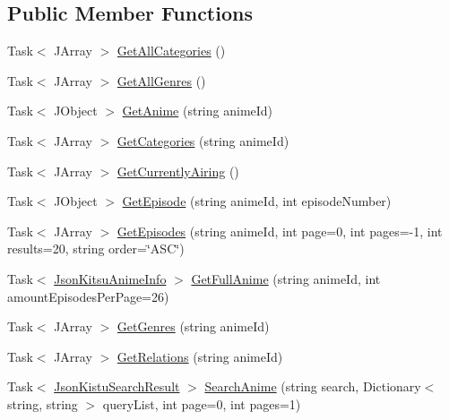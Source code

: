 \subsection*{Public Member Functions}
\begin{DoxyCompactItemize}
\item 
Task$<$ J\+Array $>$ \mbox{\hyperlink{interface_little_weeb_library_1_1_handlers_1_1_i_kitsu_handler_aac2bc10e35e89c47fe6b9954dd86442a}{Get\+All\+Categories}} ()
\item 
Task$<$ J\+Array $>$ \mbox{\hyperlink{interface_little_weeb_library_1_1_handlers_1_1_i_kitsu_handler_ad5d0744af17b926aed44fe87e6834f04}{Get\+All\+Genres}} ()
\item 
Task$<$ J\+Object $>$ \mbox{\hyperlink{interface_little_weeb_library_1_1_handlers_1_1_i_kitsu_handler_a85c4f22da758a475c55327fa6393935c}{Get\+Anime}} (string anime\+Id)
\item 
Task$<$ J\+Array $>$ \mbox{\hyperlink{interface_little_weeb_library_1_1_handlers_1_1_i_kitsu_handler_a731b56ca79910b6b1d7b2218c34e3156}{Get\+Categories}} (string anime\+Id)
\item 
Task$<$ J\+Array $>$ \mbox{\hyperlink{interface_little_weeb_library_1_1_handlers_1_1_i_kitsu_handler_a644c9e4caf1db5de18a78fe03b33e278}{Get\+Currently\+Airing}} ()
\item 
Task$<$ J\+Object $>$ \mbox{\hyperlink{interface_little_weeb_library_1_1_handlers_1_1_i_kitsu_handler_a9f182eabb098e98f566c8add1695bb36}{Get\+Episode}} (string anime\+Id, int episode\+Number)
\item 
Task$<$ J\+Array $>$ \mbox{\hyperlink{interface_little_weeb_library_1_1_handlers_1_1_i_kitsu_handler_adc4f3c45aec996b1f94894368f818de4}{Get\+Episodes}} (string anime\+Id, int page=0, int pages=-\/1, int results=20, string order=\char`\"{}A\+SC\char`\"{})
\item 
Task$<$ \mbox{\hyperlink{class_little_weeb_library_1_1_models_1_1_json_kitsu_anime_info}{Json\+Kitsu\+Anime\+Info}} $>$ \mbox{\hyperlink{interface_little_weeb_library_1_1_handlers_1_1_i_kitsu_handler_a6ea08bc341bbaa01174a451acd3d9b08}{Get\+Full\+Anime}} (string anime\+Id, int amount\+Episodes\+Per\+Page=26)
\item 
Task$<$ J\+Array $>$ \mbox{\hyperlink{interface_little_weeb_library_1_1_handlers_1_1_i_kitsu_handler_a22e208a4c0ea64dafdbeb1a133739bfd}{Get\+Genres}} (string anime\+Id)
\item 
Task$<$ J\+Array $>$ \mbox{\hyperlink{interface_little_weeb_library_1_1_handlers_1_1_i_kitsu_handler_aa82bf536086211de6b458610b83ed43f}{Get\+Relations}} (string anime\+Id)
\item 
Task$<$ \mbox{\hyperlink{class_little_weeb_library_1_1_models_1_1_json_kistu_search_result}{Json\+Kistu\+Search\+Result}} $>$ \mbox{\hyperlink{interface_little_weeb_library_1_1_handlers_1_1_i_kitsu_handler_a4afb4a1718099f9e4e39ebc237ae45a0}{Search\+Anime}} (string search, Dictionary$<$ string, string $>$ query\+List, int page=0, int pages=1)
\end{DoxyCompactItemize}


